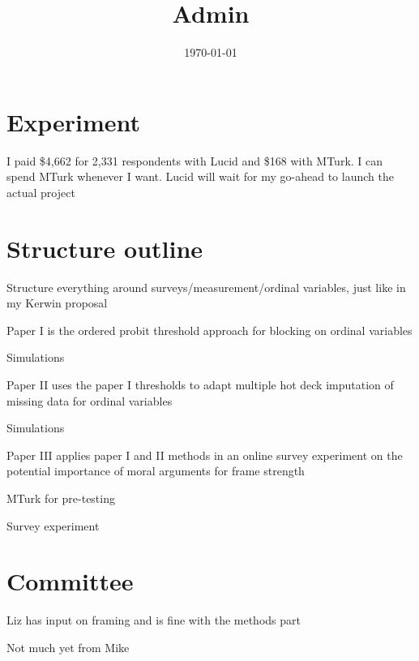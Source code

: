 

\title{Admin}

\date{\today}



\maketitle


\section*{Experiment}
	\begin{coi}
		\item I paid \$4,662 for 2,331 respondents with Lucid and \$168 with MTurk. I can spend MTurk whenever I want. Lucid will wait for my go-ahead to launch the actual project
	\end{coi}	
	
	
	
\section*{Structure outline}
	\begin{coi}
		\item Structure everything around surveys/measurement/ordinal variables, just like in my Kerwin proposal
		\item Paper I is the ordered probit threshold approach for blocking on ordinal variables
			\begin{coi}
				\item Simulations
			\end{coi}
		\item Paper II uses the paper I thresholds to adapt multiple hot deck imputation of missing data for ordinal variables
			\begin{coi}
				\item Simulations
			\end{coi}
		\item Paper III applies paper I and II methods in an online survey experiment on the potential importance of moral arguments for frame strength
			\begin{coi}
				\item MTurk for pre-testing
				\item Survey experiment
			\end{coi}
	\end{coi}

\section*{Committee}
	\begin{coi}
		\item Liz has input on framing and is fine with the methods part
		\item Not much yet from Mike
	\end{coi}



